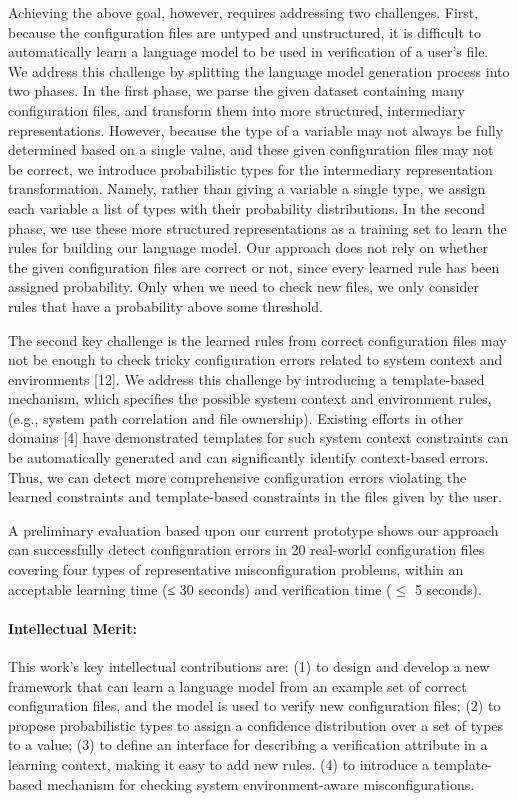 Achieving the above goal, however, requires addressing two challenges. 
First, because the configuration files are untyped and unstructured, it is difficult to automatically learn a language model to be used in verification of a user's file.
We address this challenge by splitting the language model generation process into two phases. 
In the first phase, we parse the given dataset containing many configuration files, and transform them into more structured, intermediary representations. 
However, because the type of a variable may not always be fully determined based on a single value, and these given configuration files may not be correct, we introduce probabilistic types for the intermediary representation transformation. 
Namely, rather than giving a variable a single type, we assign each variable a list of types with their probability distributions. 
In the second phase, we use these more structured representations as a training set to learn the rules for building our language model. 
Our approach does not rely on whether the given configuration files are correct or not, since every learned rule has been assigned probability. 
Only when we need to check new files, we only consider rules that have a probability above some threshold.

The second key challenge is the learned rules from correct configuration files may not be enough to check tricky configuration errors related to system context and environments [12]. 
We address this challenge by introducing a template-based mechanism, which specifies the possible system context and environment rules, (e.g., system path correlation and file ownership).
Existing efforts in other domains [4] have demonstrated templates for such system context constraints can be automatically generated and can significantly identify context-based errors.
Thus, we can detect more comprehensive configuration errors violating the learned constraints and template-based constraints in the files given by the user.

A preliminary evaluation based upon our current prototype shows our approach can successfully detect configuration errors in 20 real-world configuration files covering four types of representative misconfiguration problems, within an acceptable learning time (≤ 30 seconds) and verification time ($\le$ 5 seconds).

\paragraph{Intellectual Merit:} This work’s key intellectual contributions are: 
   (1) to design and develop a new framework that can learn a language model from an example set of correct configuration files, and the model is used to verify new configuration files;
   (2) to propose probabilistic types to assign a confidence distribution over a set of types to a value; 
   (3) to define an interface for describing a verification attribute in a learning context, making it easy to add new rules.
   (4) to introduce a template-based mechanism for checking system environment-aware misconfigurations.

